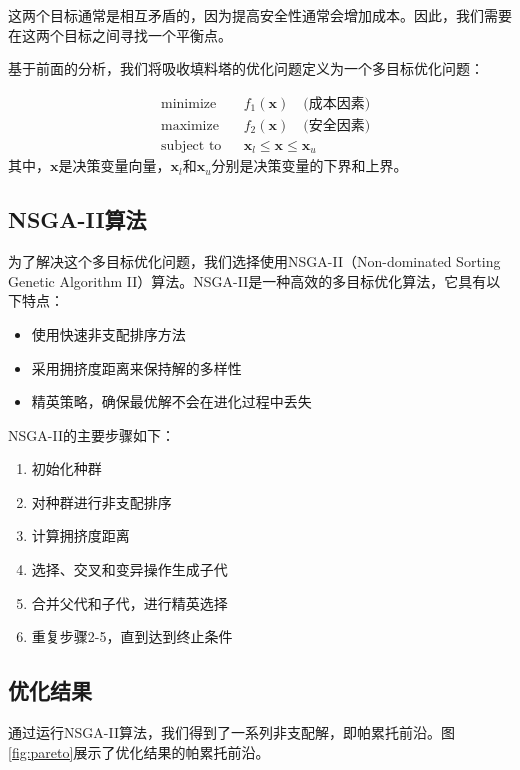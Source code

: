 这两个目标通常是相互矛盾的，因为提高安全性通常会增加成本。因此，我们需要在这两个目标之间寻找一个平衡点。

基于前面的分析，我们将吸收填料塔的优化问题定义为一个多目标优化问题：

\begin{equation}
	\begin{aligned}
		& \text{minimize}   & & f_1(\mathbf{x}) \quad \text{(成本因素)} \\
		& \text{maximize}   & & f_2(\mathbf{x}) \quad \text{(安全因素)} \\
		& \text{subject to} & & \mathbf{x}_l \leq \mathbf{x} \leq \mathbf{x}_u
	\end{aligned}
\end{equation}
其中，$\mathbf{x}$是决策变量向量，$\mathbf{x}_l$和$\mathbf{x}_u$分别是决策变量的下界和上界。

\subsection{NSGA-II算法}

为了解决这个多目标优化问题，我们选择使用NSGA-II（Non-dominated Sorting Genetic Algorithm II）算法。NSGA-II是一种高效的多目标优化算法，它具有以下特点：

\begin{itemize}
	\item 使用快速非支配排序方法
	\item 采用拥挤度距离来保持解的多样性
	\item 精英策略，确保最优解不会在进化过程中丢失
\end{itemize}

NSGA-II的主要步骤如下：

\begin{enumerate}
	\item 初始化种群
	\item 对种群进行非支配排序
	\item 计算拥挤度距离
	\item 选择、交叉和变异操作生成子代
	\item 合并父代和子代，进行精英选择
	\item 重复步骤2-5，直到达到终止条件
\end{enumerate}

\subsection{优化结果}

通过运行NSGA-II算法，我们得到了一系列非支配解，即帕累托前沿。图\ref{fig:pareto}展示了优化结果的帕累托前沿。

